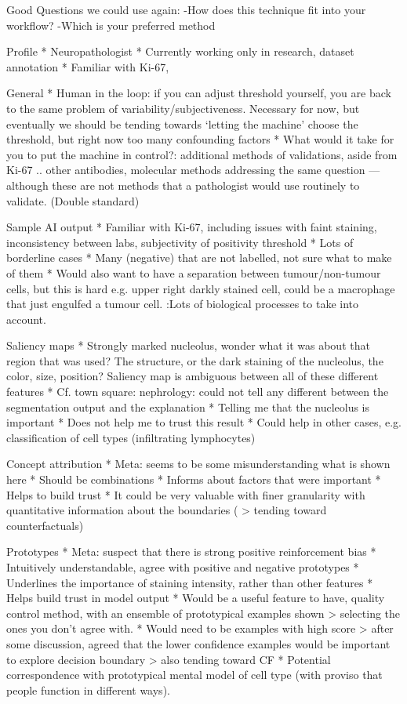 Good Questions we could use again:
-How does this technique fit into your workflow?
-Which is your preferred method 

Profile
* Neuropathologist
* Currently working only in research, dataset annotation
* Familiar with Ki-67,

General
* Human in the loop: if you can adjust threshold yourself, you are back to the same problem of variability/subjectiveness. Necessary for now, but eventually we should be tending towards ‘letting the machine’ choose the threshold, but right now too many confounding factors
* What would it take for you to put the machine in control?: additional methods of validations, aside from Ki-67 .. other antibodies, molecular methods addressing the same question — although these are not methods that a pathologist would use routinely to validate. (Double standard)

Sample AI output
* Familiar with Ki-67, including issues with faint staining, inconsistency between labs, subjectivity of positivity threshold
* Lots of borderline cases
* Many (negative) that are not labelled, not sure what to make of them
* Would also want to have a separation between tumour/non-tumour cells, but this is hard e.g. upper right darkly stained cell, could be a macrophage that just engulfed a tumour cell. :Lots of biological processes to take into account.

Saliency maps
* Strongly marked nucleolus, wonder what it was about that region that was used? The structure, or the dark staining of the nucleolus, the color, size, position? Saliency map is ambiguous between all of these different features
* Cf. town square: nephrology: could not tell any different between the segmentation output and the explanation
* Telling me that the nucleolus is important
* Does not help me to trust this result
* Could help in other cases, e.g. classification of cell types (infiltrating lymphocytes)

Concept attribution
* Meta: seems to be some misunderstanding what is shown here
* Should be combinations
* Informs about factors that were important
* Helps to build trust
* It could be very valuable with finer granularity with quantitative information about the boundaries ( > tending toward counterfactuals)

Prototypes
* Meta: suspect that there is strong positive reinforcement bias
* Intuitively understandable, agree with positive and negative prototypes
* Underlines the importance of staining intensity, rather than other features
* Helps build trust in model output
* Would be a useful feature to have, quality control method, with an ensemble of prototypical examples shown > selecting the ones you don’t agree with. 
    * Would need to be examples with high score > after some discussion, agreed that the lower confidence examples would be important to explore decision boundary > also tending toward CF
* Potential correspondence with prototypical mental model of cell type (with proviso that people function in different ways).

